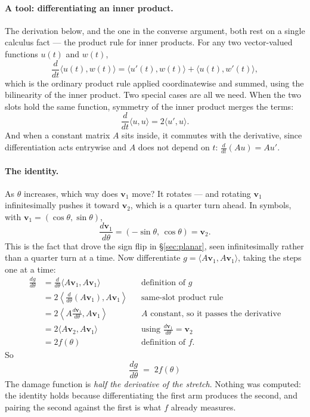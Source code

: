 \documentclass[11pt]{article}
\numberwithin{equation}{section}
\newcommand{\ip}[2]{\langle #1, #2 \rangle}
\newcommand{\Bip}[2]{\left\langle #1, #2 \right\rangle}
\newcommand{\vv}[1]{\mathbf{v}_{#1}}
\theoremstyle{plainish}
\begin{document}
\paragraph{A tool: differentiating an inner product.} The derivation below, and
the one in the converse argument, both rest on a single calculus fact --- the
product rule for inner products. For any two vector-valued functions $u(t)$ and
$w(t)$,
\begin{equation}
\frac{d}{dt}\ip{u(t)}{w(t)} = \ip{u'(t)}{w(t)} + \ip{u(t)}{w'(t)} ,
\end{equation}
which is the ordinary product rule applied coordinatewise and summed, using the
bilinearity of the inner product. Two special cases are all we need. When the two
slots hold the same function, symmetry of the inner product merges the terms:
\begin{equation}
\frac{d}{dt}\ip{u}{u} = 2\ip{u'}{u} .
\end{equation}
And when a constant matrix $A$ sits inside, it commutes with the derivative,
since differentiation acts entrywise and $A$ does not depend on $t$:
$\frac{d}{dt}(Au) = A u'$.

\paragraph{The identity.} As $\theta$ increases, which way does $\vv1$ move? It
rotates --- and rotating $\vv1$ infinitesimally pushes it toward $\vv2$, which
is a quarter turn ahead. In symbols, with $\vv1 = (\cos\theta, \sin\theta)$,
\begin{equation}\frac{d \vv1}{d\theta} = (-\sin\theta,\, \cos\theta) = \vv2 .
\end{equation}
This is the fact that drove the sign flip in \S\ref{sec:planar}, seen
infinitesimally rather than a quarter turn at a time. Now differentiate
$g = \ip{A\vv1}{A\vv1}$, taking the steps one at a time:
\begin{align}
\frac{dg}{d\theta}
  &= \frac{d}{d\theta}\ip{A\vv1}{A\vv1}
     && \text{definition of } g \nonumber\\
  &= 2\Bip{\tfrac{d}{d\theta}(A\vv1)}{A\vv1}
     && \text{same-slot product rule} \nonumber\\
  &= 2\Bip{A\tfrac{d\vv1}{d\theta}}{A\vv1}
     && \text{$A$ constant, so it passes the derivative} \nonumber\\
  &= 2\ip{A\vv2}{A\vv1}
     && \text{using } \tfrac{d\vv1}{d\theta} = \vv2 \nonumber\\
  &= 2 f(\theta)
     && \text{definition of } f .
\end{align}
So
\begin{equation}\boxed{\;\frac{dg}{d\theta} \;=\; 2 f(\theta)\;}
\end{equation}
The damage function is \emph{half the derivative of the stretch}. Nothing was
computed: the identity holds because differentiating the first arm produces the
second, and pairing the second against the first is what $f$ already measures.
\end{document}
